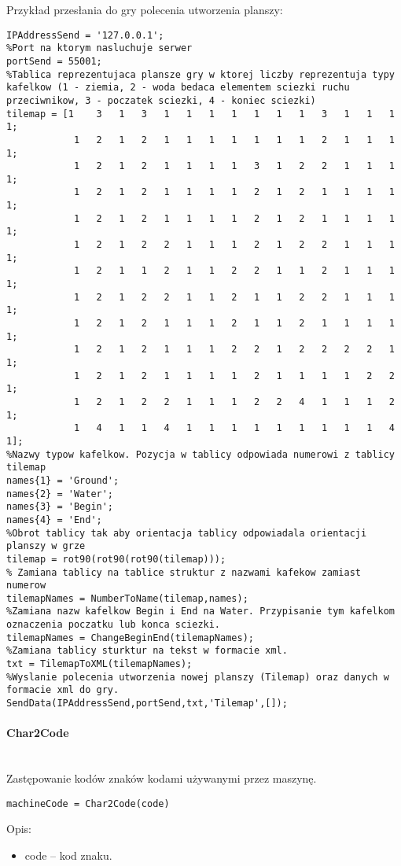 Przykład przesłania do gry polecenia utworzenia planszy:
\begin{lstlisting}[style=Matlab-editor]
%Adres serwera
IPAddressSend = '127.0.0.1';
%Port na ktorym nasluchuje serwer
portSend = 55001;
%Tablica reprezentujaca plansze gry w ktorej liczby reprezentuja typy kafelkow (1 - ziemia, 2 - woda bedaca elementem sciezki ruchu przeciwnikow, 3 - poczatek sciezki, 4 - koniec sciezki) 
tilemap = [1	3	1	3	1	1	1	1	1	1	1	3	1	1	1 1;
           	1	2	1	2	1	1	1	1	1	1	1	2	1	1	1 1;
           	1	2	1	2	1	1	1	1	3	1	2	2	1	1	1 1;
           	1	2	1	2	1	1	1	1	2	1	2	1	1	1	1 1;
           	1	2	1	2	1	1	1	1	2	1	2	1	1	1	1 1;
           	1	2	1	2	2	1	1	1	2	1	2	2	1	1	1 1;
           	1	2	1	1	2	1	1	2	2	1	1	2	1	1	1 1;
           	1	2	1	2	2	1	1	2	1	1	2	2	1	1	1 1;
           	1	2	1	2	1	1	1	2	1	1	2	1	1	1	1 1;
           	1	2	1	2	1	1	1	2	2	1	2	2	2	2	1 1;
           	1	2	1	2	1	1	1	1	2	1	1	1	1	2	2 1;
           	1	2	1	2	2	1	1	1	2	2	4	1	1	1	2 1;
           	1	4	1	1	4	1	1	1	1	1	1	1	1	1	4 1];
%Nazwy typow kafelkow. Pozycja w tablicy odpowiada numerowi z tablicy tilemap
names{1} = 'Ground';
names{2} = 'Water';
names{3} = 'Begin';
names{4} = 'End';
%Obrot tablicy tak aby orientacja tablicy odpowiadala orientacji planszy w grze
tilemap = rot90(rot90(rot90(tilemap)));
% Zamiana tablicy na tablice struktur z nazwami kafekow zamiast numerow
tilemapNames = NumberToName(tilemap,names);
%Zamiana nazw kafelkow Begin i End na Water. Przypisanie tym kafelkom oznaczenia poczatku lub konca sciezki.
tilemapNames = ChangeBeginEnd(tilemapNames);
%Zamiana tablicy sturktur na tekst w formacie xml.
txt = TilemapToXML(tilemapNames);
%Wyslanie polecenia utworzenia nowej planszy (Tilemap) oraz danych w formacie xml do gry.
SendData(IPAddressSend,portSend,txt,'Tilemap',[]);
\end{lstlisting}

\paragraph{Char2Code} \hspace{0pt} \\
Zastępowanie kodów znaków kodami używanymi przez maszynę.
\begin{lstlisting}[style=Matlab-editor]
machineCode = Char2Code(code)
\end{lstlisting}

Opis:
\begin{itemize}
\item code -- kod znaku.
\end{itemize}

